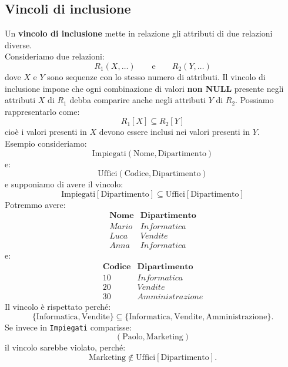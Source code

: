 \subsection{Vincoli di inclusione}
Un \textbf{vincolo di inclusione} mette in relazione gli attributi di
due relazioni diverse.\\
Consideriamo due relazioni:
\[
R_1(X,\ldots)
\qquad\text{e}\qquad
R_2(Y,\ldots)
\]
dove $X$ e $Y$ sono sequenze con lo stesso numero di attributi.
Il vincolo di inclusione impone che ogni combinazione di valori
\textbf{non NULL} presente negli attributi $X$ di $R_1$ debba comparire
anche negli attributi $Y$ di $R_2$.
Possiamo rappresentarlo come:
\[
\boxed{
R_1[X] \subseteq R_2[Y]
}
\]
cioè i valori presenti in $X$ devono essere inclusi nei valori
presenti in $Y$.\\
\textcolor{verdeEsempio}{Esempio}
consideriamo:
\[
\text{Impiegati}(\text{Nome},\text{Dipartimento})
\]
e:
\[
\text{Uffici}(\text{Codice},\text{Dipartimento})
\]
e supponiamo di avere il vincolo:
\[
\boxed{
\text{Impiegati}[\text{Dipartimento}]
\subseteq
\text{Uffici}[\text{Dipartimento}]
}
\]
Potremmo avere:
\[
\begin{array}{c|c}
\textbf{Nome} & \textbf{Dipartimento} \\ \hline
Mario & Informatica \\
Luca & Vendite \\
Anna & Informatica
\end{array}
\]
e:
\[
\begin{array}{c|c}
\textbf{Codice} & \textbf{Dipartimento} \\ \hline
10 & Informatica \\
20 & Vendite \\
30 & Amministrazione
\end{array}
\]
Il vincolo è rispettato perché:
\[
\{\text{Informatica},\text{Vendite}\}
\subseteq
\{\text{Informatica},\text{Vendite},\text{Amministrazione}\}.
\]
Se invece in \texttt{Impiegati} comparisse:
\[
(\text{Paolo},\text{Marketing})
\]
il vincolo sarebbe violato, perché:
\[
\text{Marketing}
\notin
\text{Uffici}[\text{Dipartimento}].
\]

